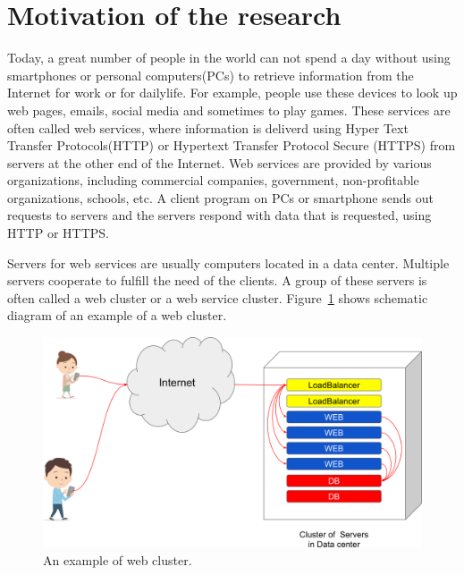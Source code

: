 
\section{Motivation of the research}
Today, a great number of people in the world can not spend a day without using smartphones or personal computers(PCs) to retrieve information from the Internet for work or for dailylife.
For example, people use these devices to look up web pages, emails, social media and sometimes to play games.
These services are often called web services, where information is deliverd using Hyper Text Transfer Protocols(HTTP) or Hypertext Transfer Protocol Secure (HTTPS) from servers at the other end of the Internet.
Web services are provided by various organizations, including commercial companies, government, non-profitable organizations, schools, etc.
A client program on PCs or smartphone sends out requests to servers and the servers respond with data that is requested, using HTTP or HTTPS. 

Servers for web services are usually computers located in a data center.
Multiple servers cooperate to fulfill the need of the clients.
A group of these servers is often called a web cluster or a web service cluster.
Figure~\ref{fig:web_cluster} shows schematic diagram of an example of a web cluster.

\begin{figure}[h]
\begin{center}
\includegraphics[width=0.8\columnwidth]{Figs/web_cluster.png}
\end{center}
\caption{
An example of web cluster.
}
\label{fig:web_cluster}
\end{figure}

